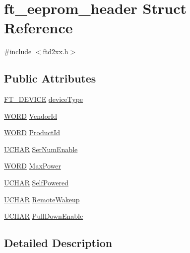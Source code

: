 \hypertarget{structft__eeprom__header}{
\section{ft\_\-eeprom\_\-header Struct Reference}
\label{structft__eeprom__header}
}


{\ttfamily \#include $<$ftd2xx.h$>$}\subsection*{Public Attributes}
\begin{DoxyCompactItemize}
\item 
\hyperlink{LALUsbx64_2include_2ftd2xx_8h_a93f97052222c089b780302ff9c175cb6}{FT\_\-DEVICE} \hyperlink{structft__eeprom__header_a3b27d86c243b51e47e6c279f0ef56251}{deviceType}
\item 
\hyperlink{LALUsbx64_2include_2WinTypes_8h_a197942eefa7db30960ae396d68339b97}{WORD} \hyperlink{structft__eeprom__header_a63538171dfe221e65f0bd27938239c30}{VendorId}
\item 
\hyperlink{LALUsbx64_2include_2WinTypes_8h_a197942eefa7db30960ae396d68339b97}{WORD} \hyperlink{structft__eeprom__header_a342079ae92d0b71e0e71bde526ded445}{ProductId}
\item 
\hyperlink{LALUsbx64_2include_2WinTypes_8h_a4f4bb67531a9bf6f0b9c6ad76aeba587}{UCHAR} \hyperlink{structft__eeprom__header_a04737398a9c4f758975303df5f0430e6}{SerNumEnable}
\item 
\hyperlink{LALUsbx64_2include_2WinTypes_8h_a197942eefa7db30960ae396d68339b97}{WORD} \hyperlink{structft__eeprom__header_a28ce835ee57a5f21794798f64022d89b}{MaxPower}
\item 
\hyperlink{LALUsbx64_2include_2WinTypes_8h_a4f4bb67531a9bf6f0b9c6ad76aeba587}{UCHAR} \hyperlink{structft__eeprom__header_a98fe9504d952d4d579dd8d047a70d175}{SelfPowered}
\item 
\hyperlink{LALUsbx64_2include_2WinTypes_8h_a4f4bb67531a9bf6f0b9c6ad76aeba587}{UCHAR} \hyperlink{structft__eeprom__header_a923b8578325e21645cc18b54784966f4}{RemoteWakeup}
\item 
\hyperlink{LALUsbx64_2include_2WinTypes_8h_a4f4bb67531a9bf6f0b9c6ad76aeba587}{UCHAR} \hyperlink{structft__eeprom__header_a3a9b620423c2d0d1f452269c255f4209}{PullDownEnable}
\end{DoxyCompactItemize}


\subsection{Detailed Description}


